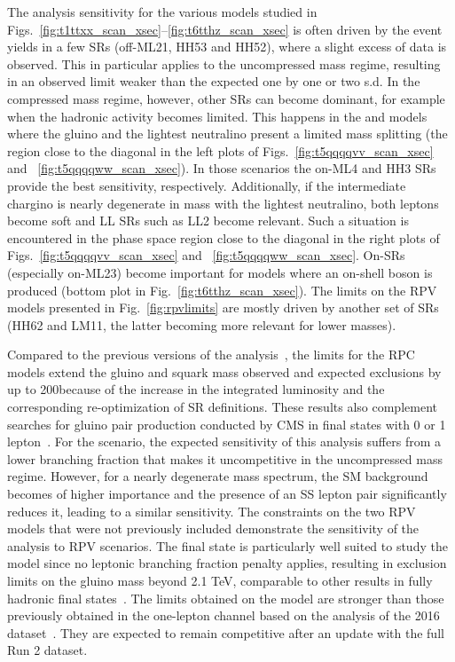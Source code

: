 The analysis sensitivity for the various models studied in Figs.~\ref{fig:t1ttxx_scan_xsec}--\ref{fig:t6tthz_scan_xsec} is often driven by the event yields in a few SRs (off-\PZ ML21, HH53 and HH52), where a slight excess of data is observed.
This in particular applies to the uncompressed mass regime, resulting in an observed limit weaker than the expected one by one or two s.d.
In the compressed mass regime, however, other SRs can become dominant, for example when the hadronic activity becomes limited. 
This happens in the \TfqqqqWZ and \TfqqqqWW models where the gluino and the lightest neutralino present a limited mass splitting (the region close to the diagonal in the left plots of Figs.~\ref{fig:t5qqqqvv_scan_xsec} and ~\ref{fig:t5qqqqww_scan_xsec}). In those scenarios the on-\PZ ML4 and HH3 SRs provide the best sensitivity, respectively. 
Additionally, if the intermediate chargino is nearly degenerate in mass with the lightest neutralino, both leptons become soft and LL SRs such as LL2 become relevant. Such a situation is encountered in the phase space region close to the diagonal in the right plots of Figs.~\ref{fig:t5qqqqvv_scan_xsec} and ~\ref{fig:t5qqqqww_scan_xsec}.
On-\PZ SRs (especially on-\PZ ML23) become important for models where an on-shell \PZ boson is produced (bottom plot in Fig.~\ref{fig:t6tthz_scan_xsec}).
The limits on the RPV models presented in Fig.~\ref{fig:rpvlimits} are mostly driven by another set of SRs (HH62 and LM11, the latter becoming more relevant for lower masses).


Compared to the previous versions of the
analysis~\cite{CMS:mySUS2016,CMS:SUS16041}, the limits for the RPC models
extend the gluino and squark mass observed and expected exclusions by up to
200\GeV because of the increase in the integrated luminosity and the
corresponding re-optimization of SR definitions. These results also
complement searches for gluino pair production conducted by CMS in final
states with 0 or 1
lepton~\cite{CMS:2019tlp,CMS:Sirunyan2019ctn,CMS:Sirunyan2019xwh}. 
For the \Totttt
scenario, the expected sensitivity of this analysis suffers from a lower
branching fraction that makes it uncompetitive in the uncompressed mass
regime. However, for a nearly degenerate mass spectrum, the SM background
becomes of higher importance and the presence of an SS lepton pair
significantly reduces it, leading to a similar sensitivity. The constraints
on the two RPV models that were not previously included demonstrate the
sensitivity of the analysis to RPV scenarios. The final state is particularly
well suited to study the \ToqqqqL model since no leptonic branching fraction
penalty applies, resulting in exclusion limits on the gluino mass beyond 2.1
TeV, comparable to other results in fully hadronic final
states~\cite{CMS:Sirunyan2019ctn,CMS:Sirunyan2019xwh}. The limits obtained on the
\Totbs model are stronger than those previously obtained in the one-lepton
channel based on the analysis of the 2016 dataset~\cite{CMS:Sirunyan2017dhe}.
They are expected to remain competitive after an update with the full Run 2
dataset.



